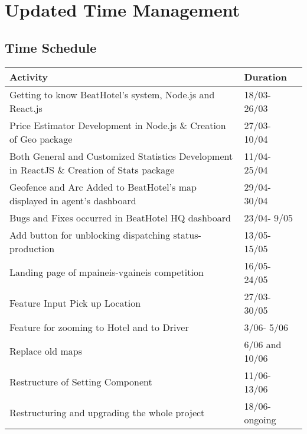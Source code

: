 
\chapter{Updated Time Management} %
\label{Chapter5}

\section{Time Schedule}
\begin{center}
	\begin{tabular}{ |p{7cm}|p{3cm}|  }
		\hline
		\textbf{Activity} & \textbf{Duration} \\ [0.3cm]
		\hline
		 Getting to know BeatHotel's system, Node.js and React.js 
		 											&  18/03- 26/03 \\[0.4cm]
		\hline
		Price Estimator Development in Node.js \& Creation of Geo package 
													&  27/03- 10/04  \\[0.4cm]
		\hline
		Both General and Customized Statistics Development in ReactJS \& Creation of Stats package
													&  11/04- 25/04  \\[0.4cm]
		\hline
		Geofence and Arc Added to BeatHotel's map displayed in agent's dashboard 
													&  29/04- 30/04  \\[0.4cm]
		\hline
		Bugs and Fixes occurred in BeatHotel HQ dashboard
													&  23/04- 9/05  \\[0.4cm]
		\hline
		Add button for unblocking dispatching status-production
													&  13/05- 15/05  \\[0.4cm]
		\hline
		Landing page of mpaineis-vgaineis competition 
													&  16/05- 24/05  \\[0.4cm]
		\hline
		Feature Input Pick up Location 
													&  27/03- 30/05  \\[0.4cm]
		\hline
		Feature for zooming to Hotel and to Driver 		
													&  3/06- 5/06  	\\[0.4cm]
		\hline
		Replace old maps						    &  6/06 and 10/06 \\[0.4cm]
		\hline
		Restructure of Setting Component			&  11/06- 13/06  \\[0.4cm]
		\hline
		Restructuring and upgrading the whole project   
													&  18/06- ongoing  \\[0.4cm]
		\hline
	\end{tabular}
\end{center}

